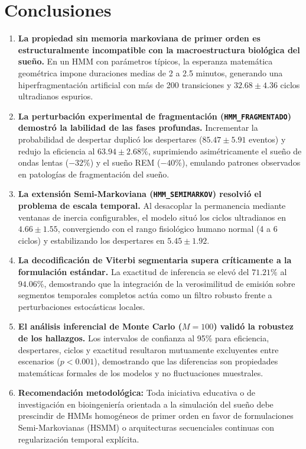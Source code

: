 \documentclass[11pt,a4paper]{article}
\begin{document}
\section{Conclusiones}

\begin{enumerate}[leftmargin=*,itemsep=1pt]
    \item \textbf{La propiedad sin memoria markoviana de primer orden es estructuralmente incompatible con la macroestructura biológica del sueño.} En un HMM con parámetros típicos, la esperanza matemática geométrica impone duraciones medias de 2 a 2.5 minutos, generando una hiperfragmentación artificial con más de 200 transiciones y $32.68 \pm 4.36$ ciclos ultradianos espurios.
    \item \textbf{La perturbación experimental de fragmentación (\texttt{HMM\_FRAGMENTADO}) demostró la labilidad de las fases profundas.} Incrementar la probabilidad de despertar duplicó los despertares ($85.47 \pm 5.91$ eventos) y redujo la eficiencia al $63.94 \pm 2.68\%$, suprimiendo asimétricamente el sueño de ondas lentas ($-32\%$) y el sueño REM ($-40\%$), emulando patrones observados en patologías de fragmentación del sueño.
    \item \textbf{La extensión Semi-Markoviana (\texttt{HMM\_SEMIMARKOV}) resolvió el problema de escala temporal.} Al desacoplar la permanencia mediante ventanas de inercia configurables, el modelo situó los ciclos ultradianos en $4.66 \pm 1.55$, convergiendo con el rango fisiológico humano normal (4 a 6 ciclos) y estabilizando los despertares en $5.45 \pm 1.92$.
    \item \textbf{La decodificación de Viterbi segmentaria supera críticamente a la formulación estándar.} La exactitud de inferencia se elevó del $71.21\%$ al $94.06\%$, demostrando que la integración de la verosimilitud de emisión sobre segmentos temporales completos actúa como un filtro robusto frente a perturbaciones estocásticas locales.
    \item \textbf{El análisis inferencial de Monte Carlo ($M=100$) validó la robustez de los hallazgos.} Los intervalos de confianza al 95\% para eficiencia, despertares, ciclos y exactitud resultaron mutuamente excluyentes entre escenarios ($p < 0.001$), demostrando que las diferencias son propiedades matemáticas formales de los modelos y no fluctuaciones muestrales.
    \item \textbf{Recomendación metodológica:} Toda iniciativa educativa o de investigación en bioingeniería orientada a la simulación del sueño debe prescindir de HMMs homogéneos de primer orden en favor de formulaciones Semi-Markovianas (HSMM) o arquitecturas secuenciales continuas con regularización temporal explícita.
\end{enumerate}
\end{document}
